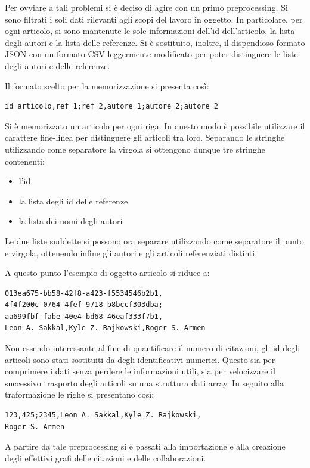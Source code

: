 \documentclass[a4paper, 12pt]{article}
\begin{document}
Per ovviare a tali problemi si è deciso di agire con un primo preprocessing. Si sono filtrati i soli dati rilevanti agli scopi del lavoro in oggetto. In particolare, per ogni articolo, si sono mantenute le sole informazioni dell'id dell'articolo, la lista degli autori e la lista delle referenze. Si è sostituito, inoltre, il dispendioso formato JSON con un formato CSV leggermente modificato per poter distinguere le liste degli autori e delle referenze.
\par
Il formato scelto per la memorizzazione si presenta così:
\begin{lstlisting}[keepspaces=true]
id_articolo,ref_1;ref_2,autore_1;autore_2;autore_2
\end{lstlisting}
Si è memorizzato un articolo per ogni riga. In questo modo è possibile utilizzare il carattere fine-linea per distinguere gli articoli tra loro.
Separando le stringhe utilizzando come separatore la virgola si ottengono dunque tre stringhe contenenti:
\begin{itemize}
  \item l'id
  \item la lista degli id delle referenze
  \item la lista dei nomi degli autori
\end{itemize}
Le due liste suddette si possono ora separare utilizzando come separatore il punto e virgola, ottenendo infine gli autori e gli articoli referenziati distinti.

A questo punto l'esempio di oggetto articolo si riduce a:
\begin{lstlisting}
013ea675-bb58-42f8-a423-f5534546b2b1,
4f4f200c-0764-4fef-9718-b8bccf303dba;
aa699fbf-fabe-40e4-bd68-46eaf333f7b1,
Leon A. Sakkal,Kyle Z. Rajkowski,Roger S. Armen
\end{lstlisting}

Non essendo interessante al fine di quantificare il numero di citazioni, gli id degli articoli sono stati sostituiti da degli identificativi numerici. Questo sia per comprimere i dati senza perdere le informazioni utili, sia per velocizzare il successivo trasporto degli articoli su una struttura dati array.
In seguito alla traformazione le righe si presentano così:
\begin{lstlisting}
123,425;2345,Leon A. Sakkal,Kyle Z. Rajkowski,
Roger S. Armen
\end{lstlisting}
A partire da tale preprocessing si è passati alla importazione e alla creazione degli effettivi grafi delle citazioni e delle collaborazioni.
\end{document}
